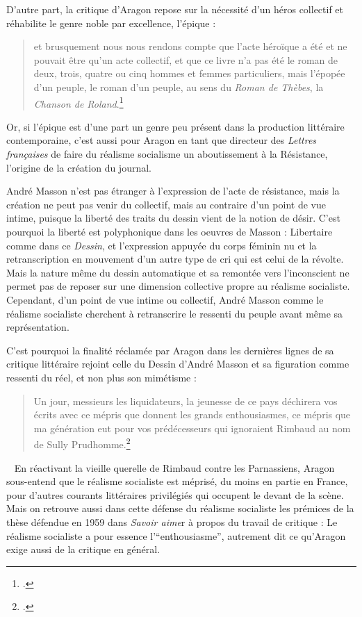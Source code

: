 	D’autre part, la critique d’Aragon repose sur la nécessité d’un héros collectif et réhabilite le genre noble par excellence, l’épique : 
	\begin{quote}
	et brusquement nous nous rendons compte que l’acte héroïque a été et ne pouvait être qu’un acte collectif, et que ce livre n’a pas été le roman de deux, trois, quatre ou cinq hommes et femmes particuliers, mais l’épopée d’un peuple, le roman d’un peuple, au sens du \emph{Roman de Thèbes}, la \emph{Chanson de Roland}.\footcite{realsoc}\end{quote}
	
	
	 Or, si l’épique est d’une part un genre peu présent dans la production littéraire contemporaine, c’est aussi pour Aragon en tant que directeur des \emph{Lettres françaises} de faire du réalisme socialisme un aboutissement à la Résistance, l’origine de la création du journal. 

	André Masson n’est pas étranger à l’expression de l’acte de résistance, mais la création ne peut pas venir du collectif, mais au contraire d’un point de vue intime, puisque la liberté des traits du dessin vient de la notion de désir. C’est pourquoi la liberté est polyphonique dans les oeuvres de Masson : Libertaire comme dans ce \emph{Dessin}, et l’expression appuyée du corps féminin nu et la retranscription en mouvement d’un autre type de cri qui est celui de la révolte. Mais la nature même du dessin automatique et sa remontée vers l’inconscient ne permet pas de reposer sur une dimension collective propre au réalisme socialiste. Cependant, d’un point de vue intime ou collectif, André Masson comme le réalisme socialiste cherchent à retranscrire le ressenti du peuple avant même sa représentation. 

	C’est pourquoi la finalité réclamée par Aragon dans les dernières lignes de sa critique littéraire rejoint celle du Dessin d’André Masson et sa figuration comme ressenti du réel, et non plus son mimétisme : 

\begin{quote}
Un jour, messieurs les liquidateurs, la jeunesse de ce pays déchirera vos écrits avec ce mépris que donnent les grands enthousiasmes, ce mépris que ma génération eut pour vos prédécesseurs qui ignoraient Rimbaud au nom de Sully Prudhomme.\footcite{realsoc}\end{quote}
 
	 En réactivant la vieille querelle de Rimbaud contre les Parnassiens, Aragon sous-entend que le réalisme socialiste est méprisé, du moins en partie en France, pour d’autres courants littéraires privilégiés qui occupent le devant de la scène. Mais on retrouve aussi dans cette défense du réalisme socialiste les prémices de la thèse défendue en 1959 dans \emph{Savoir aime}r à propos du travail de critique : Le réalisme socialiste a pour essence l’\enquote{enthousiasme}, autrement dit ce qu’Aragon exige aussi de la critique en général.  

